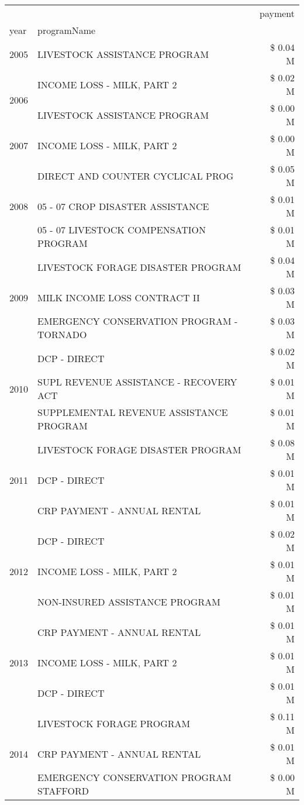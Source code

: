 \begin{tabular}{llr}
\toprule
 &  & payment \\
year & programName &  \\
\midrule
2005 & LIVESTOCK ASSISTANCE PROGRAM & \$ 0.04 M \\
\cline{1-3}
\multirow[t]{2}{*}{2006} & INCOME LOSS - MILK, PART 2 & \$ 0.02 M \\
 & LIVESTOCK ASSISTANCE PROGRAM & \$ 0.00 M \\
\cline{1-3}
2007 & INCOME LOSS - MILK, PART 2 & \$ 0.00 M \\
\cline{1-3}
\multirow[t]{3}{*}{2008} & DIRECT AND COUNTER CYCLICAL PROG & \$ 0.05 M \\
 & 05 - 07 CROP DISASTER ASSISTANCE & \$ 0.01 M \\
 & 05 - 07 LIVESTOCK COMPENSATION PROGRAM & \$ 0.01 M \\
\cline{1-3}
\multirow[t]{3}{*}{2009} & LIVESTOCK FORAGE DISASTER  PROGRAM & \$ 0.04 M \\
 & MILK INCOME LOSS CONTRACT II & \$ 0.03 M \\
 & EMERGENCY CONSERVATION PROGRAM - TORNADO & \$ 0.03 M \\
\cline{1-3}
\multirow[t]{3}{*}{2010} & DCP - DIRECT & \$ 0.02 M \\
 & SUPL REVENUE ASSISTANCE - RECOVERY ACT & \$ 0.01 M \\
 & SUPPLEMENTAL REVENUE ASSISTANCE PROGRAM & \$ 0.01 M \\
\cline{1-3}
\multirow[t]{3}{*}{2011} & LIVESTOCK FORAGE DISASTER PROGRAM & \$ 0.08 M \\
 & DCP - DIRECT & \$ 0.01 M \\
 & CRP PAYMENT - ANNUAL RENTAL & \$ 0.01 M \\
\cline{1-3}
\multirow[t]{3}{*}{2012} & DCP - DIRECT & \$ 0.02 M \\
 & INCOME LOSS - MILK, PART 2 & \$ 0.01 M \\
 & NON-INSURED ASSISTANCE PROGRAM & \$ 0.01 M \\
\cline{1-3}
\multirow[t]{3}{*}{2013} & CRP PAYMENT - ANNUAL RENTAL & \$ 0.01 M \\
 & INCOME LOSS - MILK, PART 2 & \$ 0.01 M \\
 & DCP - DIRECT & \$ 0.01 M \\
\cline{1-3}
\multirow[t]{3}{*}{2014} & LIVESTOCK FORAGE PROGRAM & \$ 0.11 M \\
 & CRP PAYMENT - ANNUAL RENTAL & \$ 0.01 M \\
 & EMERGENCY CONSERVATION PROGRAM STAFFORD & \$ 0.00 M \\

\end{tabular}
